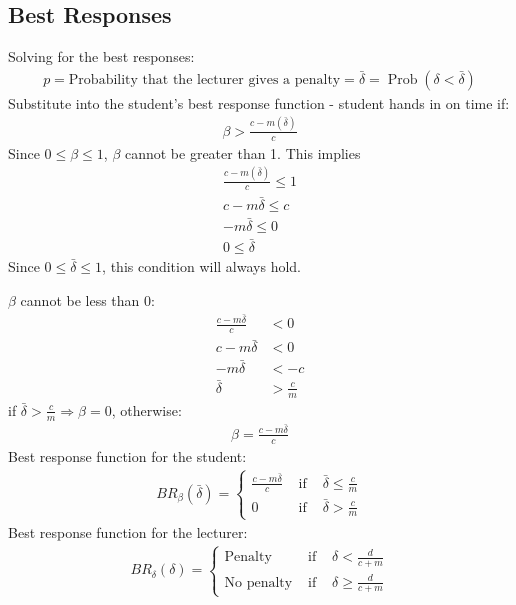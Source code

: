 \documentclass[11pt,preprint, authoryear]{elsarticle}
\numberwithin{equation}{section}
\numberwithin{figure}{section}
\numberwithin{table}{section}
\begin{document}
\hypertarget{best-responses}{%
\subsection*{\texorpdfstring{Best Responses
\label{br}}{Best Responses }}\label{best-responses}}

Solving for the best responses: \begin{align*}
p=\text{Probability that the lecturer gives a penalty} = \bar{\delta}=\operatorname{Prob}(\delta<\bar{\delta})
\end{align*} Substitute into the student's best response function -
student hands in on time if: \begin{align*}{}
\beta>\frac{c-m(\bar{\delta})}{c}
\end{align*}{} Since \(0 \leq \beta \leq 1\), \(\beta\) cannot be
greater than 1. This implies \begin{align*}{}
\frac{c-m(\bar{\delta})}{c} \leq 1 \\
c-m \bar{\delta} \leq c \\
-m \bar{\delta} \leq 0 \\
0 \leq \bar{\delta}
\end{align*}{} Since \(0 \leq \bar{\delta} \leq 1\), this condition will
always hold.

\(\beta\) cannot be less than 0: \begin{align*}
\frac{c-m \bar{\delta}}{c}&<0 \\
c-m \bar{\delta}&<0 \\
-m \bar{\delta}&< -c \\
\bar{\delta}&>\frac{c}{m}
\end{align*} if \(\bar{\delta}>\frac{c}{m} \Rightarrow \beta=0\),
otherwise: \begin{align*}
\beta =\frac{c-m \bar{\delta}}{c}
\end{align*} Best response function for the student: \begin{align*}
B R_{\beta}(\bar{\delta})=\left\{\begin{array}{lll}
\frac{c-m\bar{\delta}}{c} & \text { if } & \bar{\delta}\leq \frac{c}{m} \\
0 & \text { if } & \bar{\delta}> \frac{c}{m}
\end{array}\right.
\end{align*} Best response function for the lecturer: \begin{align*}
B R_{\delta}(\delta)=\left\{\begin{array}{lll}
\text{Penalty} & \text { if } & \delta<\frac{d}{c+m} \\
\text{No penalty} & \text { if } & \delta \geq \frac{d}{c+m}
\end{array}\right.
\end{align*}
\end{document}
